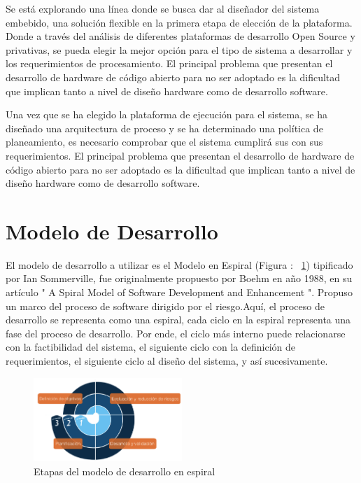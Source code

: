 Se está explorando una línea donde se busca dar al diseñador del sistema embebido, una solución flexible en la primera etapa de elección de
la plataforma. Donde a través del análisis de diferentes plataformas de desarrollo Open Source y privativas, se pueda elegir la mejor opción para el
tipo de sistema a desarrollar y los requerimientos de procesamiento. El principal problema que presentan el desarrollo de hardware de código abierto para
no ser adoptado es la dificultad que implican tanto a nivel de diseño hardware como de desarrollo software. 

Una vez que se ha elegido la plataforma de ejecución para el sistema, se ha diseñado una arquitectura de proceso y se ha determinado una política de
planeamiento, es necesario comprobar que el sistema cumplirá sus con sus requerimientos. El principal problema que presentan el desarrollo de
hardware de código abierto para no ser adoptado es la dificultad que implican tanto a nivel de diseño hardware como de desarrollo software.

\section{Modelo de Desarrollo}
El modelo de desarrollo a utilizar es el Modelo en Espiral (Figura : ~\ref{fig:esquema}) tipificado por Ian Sommerville\cite{Etiqueta00}, fue
originalmente propuesto por Boehm en año 1988, en su artículo " A Spiral Model of Software Development and Enhancement ". Propuso un marco del
proceso de software dirigido por el riesgo.Aquí, el proceso de desarrollo se representa como una espiral, cada ciclo en la espiral representa una
fase del proceso de desarrollo. Por ende, el ciclo más interno puede relacionarse con la factibilidad del sistema, el siguiente ciclo con la
definición de requerimientos, el siguiente ciclo al diseño del sistema, y así sucesivamente. 

\begin{figure}[h!]
 \begin{center}
  \includegraphics[width=0.5\textwidth,keepaspectratio=true]{./images/ESPIRAL}
  \caption{Etapas del modelo de desarrollo en espiral}
  \label{fig:esquema}
 \end{center}
\end{figure}

